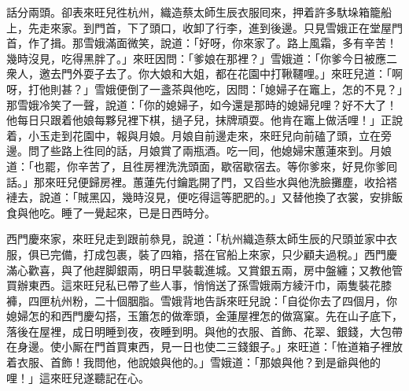 話分兩頭。卻表來旺兒徃杭州，織造蔡太師生辰衣服囘來，押着許多馱垛箱籠船上，先走來家。到門首，下了頭口，收卸了行李，進到後邊。只見雪娥正在堂屋門首，作了揖。那雪娥滿面微笑，{}說道：「好呀，你來家了。{}路上風霜，多有辛苦！幾時沒見，吃得黑胖了。」來旺因問：「爹娘在那裡？」雪娥道：「你爹今日被應二衆人，邀去門外耍子去了。你大娘和大姐，都在花園中打鞦韆哩。」來旺兒道：「啊呀，打他則甚？」雪娥便倒了一盞茶與他吃，因問：「媳婦子在竈上，怎的不見？」那雪娥冷笑了一聲，說道：「你的媳婦子，如今還是那時的媳婦兒哩？好不大了！他每日只跟着他娘每夥兒裡下棋，撾子兒，抹牌頑耍。他肯在竈上做活哩！」正說着，小玉走到花園中，報與月娘。月娘自前邊走來，來旺兒向前磕了頭，立在旁邊。問了些路上徃囘的話，月娘賞了兩瓶酒。吃一囘，他媳婦宋蕙蓮來到。月娘道：「也罷，你辛苦了，且徃房裡洗洗頭面，歇宿歇宿去。等你爹來，好見你爹囘話。」那來旺兒便歸房裡。蕙蓮先付鑰匙開了門，又舀些水與他洗臉攤塵，收拾褡褳去，說道：「賊黑囚，幾時沒見，便吃得這等肥肥的。」又替他換了衣裳，安排飯食與他吃。睡了一覺起來，已是日西時分。

西門慶來家，來旺兒走到跟前叅見，說道：「杭州織造蔡太師生辰的尺頭並家中衣服，俱已完備，打成包裹，裝了四箱，搭在官船上來家，只少顧夫過稅。」西門慶滿心歡喜，與了他趕脚銀兩，明日早裝載進城。又賞銀五兩，房中盤纏；又教他管買辦東西。{}這來旺兒私已帶了些人事，悄悄送了孫雪娥兩方綾汗巾，兩隻裝花膝褲，四匣杭州粉，二十個胭脂。{}雪娥背地告訴來旺兒說：「自從你去了四個月，你媳婦怎的和西門慶勾搭，玉簫怎的做牽頭，金蓮屋裡怎的做窩窠。先在山子底下，落後在屋裡，成日明睡到夜，夜睡到明。與他的衣服、首飾、花翠、銀錢，大包帶在身邊。使小厮在門首買東西，見一日也使二三錢銀子。」來旺道：「恠道箱子裡放着衣服、首飾！我問他，他說娘與他的。」雪娥道：「那娘與他？到是爺與他的哩！」{}這來旺兒遂聽記在心。

